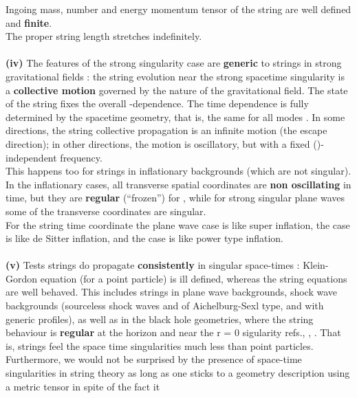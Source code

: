 \documentclass[12pt,a4paper]{article}
\begin{document}
Ingoing mass, number and energy momentum tensor of the string are well 
defined and {\bf finite}. \\
The proper string length stretches indefinitely. \\ \\
{\bf (iv)} The features of the strong singularity case are {\bf generic} to 
strings in strong gravitational fields : the string evolution near the strong 
spacetime singularity is a {\bf collective motion} governed by the nature of the gravitational field. The state of the string fixes the overall 
\myHighlight{$\sigma $}\coordHE{}-dependence. The time dependence is fully determined by the 
spacetime geometry, that is, the same for all modes \coordHE{}. In some directions, 
the string collective propagation is an infinite motion (the escape direction); in other directions, the motion is oscillatory, but with a fixed (\coordHE{})-
independent frequency. \\
This happens too for strings in inflationary backgrounds (which are not 
singular). 
In the inflationary cases, all transverse spatial coordinates are 
{\bf non oscillating} in time, but they are {\bf regular} (``frozen'') 
for \coordHE{}, while for strong singular plane waves some of the 
transverse coordinates are singular. \\
For the string time coordinate the plane wave case \coordHE{} is like 
super inflation, the case \coordHE{} is like de Sitter inflation, and 
the case \coordHE{} is like power type inflation. \\ \\
{\bf (v)} Tests strings do propagate {\bf consistently} in singular space-times : 
Klein-Gordon equation (for a point particle) is ill defined, whereas the 
string equations are well behaved. This includes strings in plane wave 
backgrounds, shock wave  backgrounds (sourceless shock waves and of Aichelburg-Sexl 
type, and with generic profiles), as well as in the black hole geometries, where the string behaviour is 
{\bf regular} at the horizon and near the r = 0 sigularity refs.\cite{vs8}, 
\cite{vs9}, \cite{ls1}. That is, strings feel the space time singularities 
much less than point particles. \\
Furthermore, we would not be surprised by the presence of space-time 
singularities in string theory as long as one sticks to a geometry 
description using a metric tensor \coordHE{} in spite of the fact it 
\end{document}
